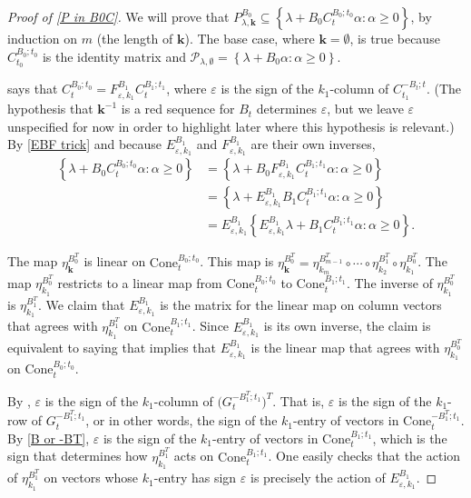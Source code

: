 \documentclass{amsart}
\theoremstyle{definition}
\theoremstyle{remark}
\numberwithin{equation}{section}
\newcommand{\ep}{\varepsilon}
\newcommand{\set}[1]{{\left\lbrace #1 \right\rbrace}}
\renewcommand{\th}{^\text{th}}
\newcommand{\0}{{\mathbf{0}}}
\newcommand{\Cone}{\mathrm{Cone}}
\newcommand{\kk}{\mathbf{k}}
\renewcommand{\P}{\mathcal{P}}
\renewcommand{\th}{^\text{th}}
\begin{document}
\begin{proof}[Proof of \cref{P in B0C}]
We will prove that $P^{B_0}_{\lambda,\kk}\subseteq\set{\lambda+B_0C_t^{B_0;t_0}\alpha:\alpha\ge0}$, by induction on $m$ (the length of $\kk$).
The base case, where $\kk=\emptyset$, is true because $C_{t_0}^{B_0;t_0}$ is the identity matrix and $\P_{\lambda,\emptyset}=\set{\lambda+B_0\alpha:\alpha\ge0}$.
 
\cite[Proposition~1.4]{NZ12} says that $C_t^{B_0;t_0}=F^{B_1}_{\ep,k_1}C_t^{B_1;t_1}$, where $\ep$ is the sign of the $k_1$-column of $C_{t_1}^{-B_t;t}$.  
(The hypothesis that $\kk^{-1}$ is a red sequence for $B_t$ determines $\ep$, but we leave $\ep$ unspecified for now in order to highlight later where this hypothesis is relevant.)
By \cref{EBF trick} and because $E^{B_1}_{\ep,k_1}$ and $F^{B_1}_{\ep,k_1}$ are their own inverses,
\begin{equation}\label{ind B0C}\begin{aligned}
\set{\lambda+B_0C_t^{B_0;t_0}\alpha:\alpha\ge0}
&=\set{\lambda+B_0F^{B_1}_{\ep,k_1}C_t^{B_1;t_1}\alpha:\alpha\ge0}\\
&=\set{\lambda+E^{B_1}_{\ep,k_1}B_1C_t^{B_1;t_1}\alpha:\alpha\ge0}\\
&=E^{B_1}_{\ep,k_1}\set{E^{B_1}_{\ep,k_1}\lambda+B_1C_t^{B_1;t_1}\alpha:\alpha\ge0}.
\end{aligned}\end{equation}

The map $\eta_{\kk}^{B_0^T}$ is linear on $\Cone_t^{B_0;t_0}$.  
This map is $\eta_{\kk}^{B_0^T}={\eta_{k_m}^{B_{m-1}^T}\circ\cdots\circ\eta_{k_2}^{B_1^T}\circ\eta_{k_1}^{B_0^T}}$.
The map $\eta_{k_1}^{B_0^T}$ restricts to a linear map from $\Cone_t^{B_0;t_0}$ to $\Cone_t^{B_1;t_1}$.
The inverse of $\eta_{k_1}^{B_0^T}$ is $\eta_{k_1}^{B_1^T}$.
We claim that $E^{B_1}_{\ep,k_1}$ is the matrix for the linear map on column vectors that agrees with $\eta_{k_1}^{B_1^T}$ on $\Cone_t^{B_1;t_1}$.
Since $E^{B_1}_{\ep,k_1}$ is its own inverse, the claim is equivalent to saying that implies that $E^{B_1}_{\ep,k_1}$ is the linear map that agrees with $\eta_{k_1}^{B_0^T}$ on $\Cone_t^{B_0;t_0}$.

By \cite[(1.13)]{NZ12}, $\ep$ is the sign of the $k_1$-column of $\bigl(G_t^{-B_1^T;t_1}\bigr)^T$.
That is, $\ep$ is the sign of the $k_1$-row of $G_t^{-B_1^T;t_1}$, or in other words, the sign of the $k_1$-entry of vectors in $\Cone_t^{-B^T_1;t_1}$.
By \cref{B or -BT}, $\ep$ is the sign of the $k_1$-entry of vectors in $\Cone_t^{B_1;t_1}$, which is the sign that determines how $\eta_{k_1}^{B_1^T}$ acts on $\Cone_t^{B_1;t_1}$.
One easily checks that the action of $\eta_{k_1}^{B_1^T}$ on vectors whose $k_1$-entry has sign $\ep$ is precisely the action of $E^{B_1}_{\ep,k_1}$.


\end{proof}
\end{document}
